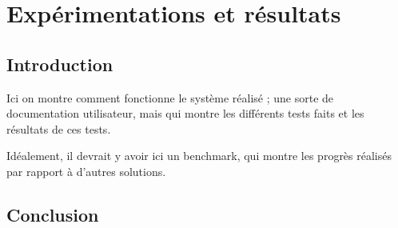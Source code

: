 \chapter{Expérimentations et résultats}
\minitoc
\newpage

\section{Introduction}

Ici on montre comment fonctionne le système réalisé ; une sorte de documentation utilisateur, mais qui montre les différents tests faits et les résultats de ces tests. 

Idéalement, il devrait y avoir ici un benchmark, qui montre les progrès réalisés par rapport à d'autres solutions.

\section{Conclusion}